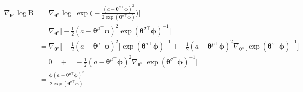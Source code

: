 \documentclass{article}
\newcommand{\grad}[1]{\nabla_{#1}}
\newcommand{\thetab}{\bm{\theta}}
\newcommand{\phib}{\bm{\phi}}
\begin{document}
\begin{align*}
\grad{\thetab^\sigma} \log \text{B} &= \grad{\thetab^\sigma} \log \bigg[ \exp\bigg(- \frac{(a - \thetab^{\mu\top}\phib)^2}{2\exp(\thetab^{\sigma\top}\phib)}\bigg)\bigg]\\
&=\grad{\thetab^\sigma} \bigg[ - \frac{1}{2}(a - \thetab^{\mu\top}\phib)^2\exp(\thetab^{\sigma\top}\phib)^{-1}\bigg]\\
&=\grad{\thetab^\sigma} \bigg[ - \frac{1}{2}(a - \thetab^{\mu\top}\phib)^2\bigg]\exp(\thetab^{\sigma\top}\phib)^{-1} +  - \frac{1}{2}(a - \thetab^{\mu\top}\phib)^2 \grad{\thetab^\sigma} \bigg[\exp(\thetab^{\sigma\top}\phib)^{-1}\bigg]\\
&=0\quad +\quad  - \frac{1}{2}(a - \thetab^{\mu\top}\phib)^2 \grad{\thetab^\sigma} \bigg[\exp(\thetab^{\sigma\top}\phib)^{-1}\bigg]\\
&= \frac{{\phib} (a - \thetab^{\mu\top}\phib)^2}{2\exp(\thetab^{\sigma\top}\phib)}\\
\end{align*}




	
\end{document}
